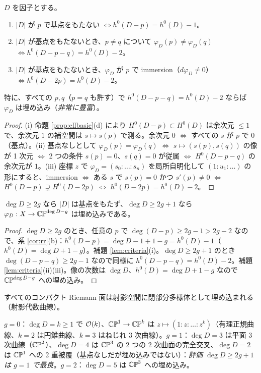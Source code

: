 \begin{lem}\label{lem:criteria}
$D$ を因子とする。
\begin{enumerate}
\item[(i)] $|D|$ が $p$ で基点をもたない $\iff h^0(D-p)=h^0(D)-1$。
\item[(ii)] $|D|$ が基点をもたないとき、$p\ne q$ について $\varphi_D(p)\ne\varphi_D(q)$ $\iff h^0(D-p-q)=h^0(D)-2$。
\item[(iii)] $|D|$ が基点をもたないとき、$\varphi_D$ が $p$ で immersion（$d\varphi_D\ne0$） $\iff h^0(D-2p)=h^0(D)-2$。
\end{enumerate}
特に、すべての $p,q$（$p=q$ も許す）で $h^0(D-p-q)=h^0(D)-2$ ならば $\varphi_D$ は埋め込み（\emph{非常に豊富}）。
\end{lem}
\begin{proof}
(i) 命題 \ref{prop:ellbasic}(d) により $H^0(D-p)\subset H^0(D)$ は余次元 $\le1$ で、余次元 $1$ の補空間は $s\mapsto s(p)$ で測る。余次元 $0$ $\iff$ すべての $s$ が $p$ で $0$（基点）。(ii) 基点なしとして $\varphi_D(p)=\varphi_D(q)$ $\iff$ $s\mapsto(s(p),s(q))$ の像が 1 次元 $\iff$ 2 つの条件 $s(p)=0$、$s(q)=0$ が従属 $\iff$ $H^0(D-p-q)$ の余次元が $1$。(iii) 座標 $z$ で $\varphi_D=(s_0:\dots:s_n)$ を局所自明化して $(1:u_1:\dots)$ の形にすると、immersion $\iff$ ある $s$ で $s(p)=0$ かつ $s'(p)\ne0$ $\iff$ $H^0(D-p)\supsetneq H^0(D-2p)$ $\iff$ $h^0(D-2p)=h^0(D)-2$。 
\end{proof}

\begin{thm}[高次の因子は非常に豊富]\label{thm:veryample}
$\deg D\ge2g$ なら $|D|$ は基点をもたず、$\deg D\ge2g+1$ なら $\varphi_D:X\to\mathbb{CP}^{\deg D-g}$ は埋め込みである。
\end{thm}
\begin{proof}
$\deg D\ge2g$ のとき、任意の $p$ で $\deg(D-p)\ge2g-1>2g-2$ なので、系 \ref{cor:rr}(b)：$h^0(D-p)=\deg D-1+1-g=h^0(D)-1$（$h^0(D)=\deg D+1-g$）。補題 \ref{lem:criteria}(i)。$\deg D\ge2g+1$ のとき $\deg(D-p-q)\ge2g-1$ なので同様に $h^0(D-p-q)=h^0(D)-2$。補題 \ref{lem:criteria}(ii)(iii)。像の次数は $\deg D$、$h^0(D)=\deg D+1-g$ なので $\mathbb{CP}^{\deg D-g}$ への埋め込み。 
\end{proof}
\begin{cor}[Riemann]\label{cor:projective}
すべてのコンパクト Riemann 面は射影空間に閉部分多様体として埋め込まれる（射影代数曲線）。
\end{cor}
\begin{ex}\label{ex:veryample}
$g=0$：$\deg D=k\ge1$ で $\mathcal O(k)$、$\mathbb{CP}^1\to\mathbb{CP}^k$ は $z\mapsto(1:z:\dots:z^k)$（有理正規曲線、$k=2$ は円錐曲線、$k=3$ はねじれ 3 次曲線）。$g=1$：$\deg D=3$ は平面 3 次曲線（$\mathbb{CP}^2$）、$\deg D=4$ は $\mathbb{CP}^3$ の 2 つの 2 次曲面の完全交叉、$\deg D=2$ は $\mathbb{CP}^1$ への 2 重被覆（基点なしだが埋め込みではない）：\emph{評価 $\deg D\ge2g+1$ は $g=1$ で最良}。$g=2$：$\deg D=5$ は $\mathbb{CP}^3$ への埋め込み。
\end{ex}

